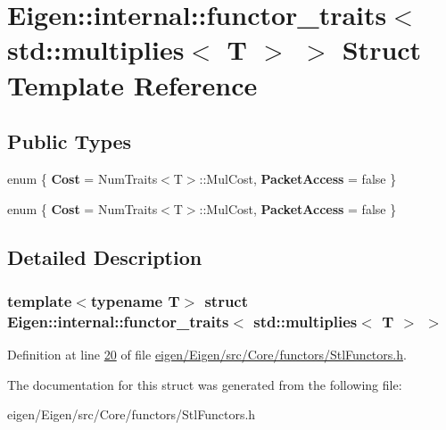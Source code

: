 \hypertarget{struct_eigen_1_1internal_1_1functor__traits_3_01std_1_1multiplies_3_01_t_01_4_01_4}{}\section{Eigen\+:\+:internal\+:\+:functor\+\_\+traits$<$ std\+:\+:multiplies$<$ T $>$ $>$ Struct Template Reference}
\label{struct_eigen_1_1internal_1_1functor__traits_3_01std_1_1multiplies_3_01_t_01_4_01_4}
\subsection*{Public Types}
\begin{DoxyCompactItemize}
\item 
\mbox{\label{struct_eigen_1_1internal_1_1functor__traits_3_01std_1_1multiplies_3_01_t_01_4_01_4_a159f2ece060d3a44ed910a0e301ddada}} 
enum \{ {\bfseries Cost} = Num\+Traits$<$T$>$\+:\+:Mul\+Cost, 
{\bfseries Packet\+Access} = false
 \}
\item 
\mbox{\label{struct_eigen_1_1internal_1_1functor__traits_3_01std_1_1multiplies_3_01_t_01_4_01_4_a02fb0e21a4367e8a5628c30335ca1898}} 
enum \{ {\bfseries Cost} = Num\+Traits$<$T$>$\+:\+:Mul\+Cost, 
{\bfseries Packet\+Access} = false
 \}
\end{DoxyCompactItemize}


\subsection{Detailed Description}
\subsubsection*{template$<$typename T$>$\newline
struct Eigen\+::internal\+::functor\+\_\+traits$<$ std\+::multiplies$<$ T $>$ $>$}



Definition at line \hyperlink{eigen_2_eigen_2src_2_core_2functors_2_stl_functors_8h_source_l00020}{20} of file \hyperlink{eigen_2_eigen_2src_2_core_2functors_2_stl_functors_8h_source}{eigen/\+Eigen/src/\+Core/functors/\+Stl\+Functors.\+h}.



The documentation for this struct was generated from the following file\+:\begin{DoxyCompactItemize}
\item 
eigen/\+Eigen/src/\+Core/functors/\+Stl\+Functors.\+h\end{DoxyCompactItemize}
